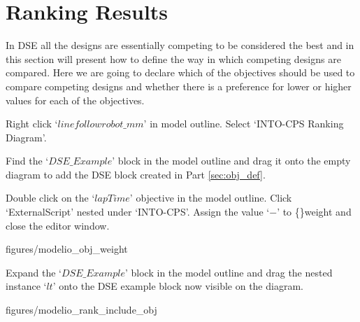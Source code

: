 \documentclass[11pt,a4paper]{../tutorial}
\begin{document}
\newpage
\section{Ranking Results}

In DSE all the designs are essentially competing to be considered the best and in this section will present how to define the way in which competing designs are compared.  Here we are going to declare which of the objectives should be used to compare competing designs and whether there is a preference for lower or higher values for each of the objectives.

\begin{instructions}

\item Right click `$linefollowrobot\_mm$' in model outline. Select `INTO-CPS \menusep Ranking Diagram'.

\item Find the `$DSE\_Example$' block in the model outline and drag it onto the empty diagram to add the DSE block created in Part \ref{sec:obj_def}.

\item \label{start_add_rank} Double click on the `$lapTime$' objective in the model outline. Click `ExternalScript' nested under `INTO-CPS'. Assign the value `$-$' to \{\}weight and close the editor window.

\begin{center}
\begin{annotation}[width=0.7\linewidth]{figures/modelio_obj_weight}
    \end{annotation}
\end{center}

\newpage

\item Expand the `$DSE\_Example$' block in the model outline and drag the nested instance `$lt$' onto the DSE example block now visible on the diagram.

\begin{center}
\begin{annotation}[width=0.7\linewidth]{figures/modelio_rank_include_obj}
    \end{annotation}
\end{center}


\end{instructions}
\end{document}
